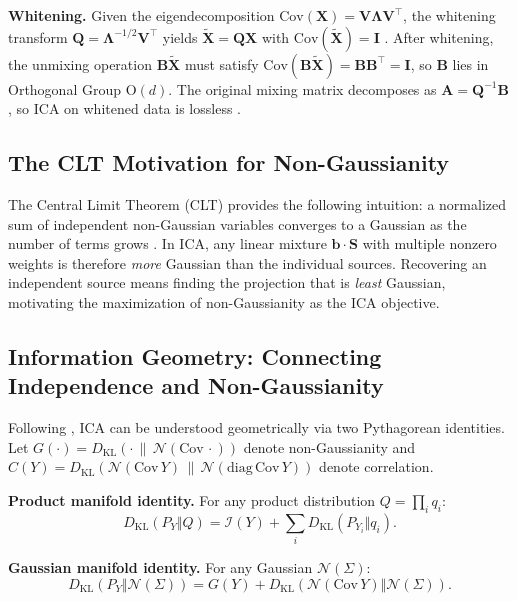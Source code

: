 \documentclass[accepted]{tpm2026} %
\begin{document}
\textbf{Whitening.} Given the eigendecomposition $\mathrm{Cov}(\mathbf{X}) = \mathbf{V}\boldsymbol{\Lambda}\mathbf{V}^\top$, the whitening transform $\mathbf{Q} = \boldsymbol{\Lambda}^{-1/2}\mathbf{V}^\top$ yields $\widetilde{\mathbf{X}} = \mathbf{Q}\mathbf{X}$ with $\mathrm{Cov}(\widetilde{\mathbf{X}}) = \mathbf{I}$ \citep{hyvarinen2001}.
After whitening, the unmixing operation $\mathbf{B}\widetilde{\mathbf{X}}$ must satisfy $\mathrm{Cov}(\mathbf{B}\widetilde{\mathbf{X}}) = \mathbf{B}\mathbf{B}^\top = \mathbf{I}$, so $\mathbf{B}$ lies in Orthogonal Group $\mathrm{O}(d)$.
The original mixing matrix decomposes as $\mathbf{A} = \mathbf{Q}^{-1}\mathbf{B}$, so ICA on whitened data is lossless \citep{cardoso2022}.

\subsection{The CLT Motivation for Non-Gaussianity}

The Central Limit Theorem (CLT) provides the following intuition: a normalized sum of independent non-Gaussian variables converges to a Gaussian as the number of terms grows \citep{hyvarinen2001}. In ICA, any linear mixture $\mathbf{b}\cdot\mathbf{S}$ with multiple nonzero weights is therefore \emph{more} Gaussian than the individual sources. Recovering an independent source means finding the projection that is \emph{least} Gaussian, motivating the maximization of non-Gaussianity as the ICA objective.

\subsection{Information Geometry: Connecting Independence and Non-Gaussianity}

Following \citet{cardoso2022}, ICA can be understood geometrically via two Pythagorean identities.
Let $G(\cdot) = D_{\mathrm{KL}}(\cdot \,\|\, \mathcal{N}(\mathrm{Cov}\,\cdot))$ denote non-Gaussianity and $C(Y) = D_{\mathrm{KL}}(\mathcal{N}(\mathrm{Cov}\,Y) \,\|\, \mathcal{N}(\mathrm{diag\,Cov}\,Y))$ denote correlation.

\textbf{Product manifold identity.} For any product distribution $Q = \prod_i q_i$:
\begin{equation}
    D_{\mathrm{KL}}(P_Y \Vert Q) = \mathscr{I}(Y) + \sum_{i} D_{\mathrm{KL}}(P_{Y_i} \Vert q_i).
\end{equation}

\textbf{Gaussian manifold identity.} For any Gaussian $\mathcal{N}(\Sigma)$:
\begin{equation}
    D_{\mathrm{KL}}(P_Y \Vert \mathcal{N}(\Sigma)) = G(Y) + D_{\mathrm{KL}}(\mathcal{N}(\mathrm{Cov}\,Y) \Vert \mathcal{N}(\Sigma)).
\end{equation}
\end{document}
